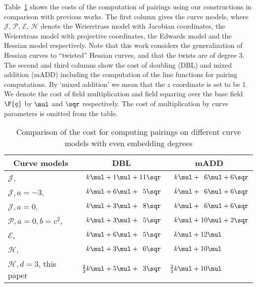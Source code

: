 Table~\ref{tbl-even} shows the costs of the computation of pairings using our constructions in comparison with previous works.
The first column gives the curve models, where 
$\mathcal{J}$, $\mathcal{P}$, $\mathcal{E}$, $\mathcal{H}$ denote the
Weierstrass model with Jacobian coordinates, the
Weierstrass model with projective coordinates,
the Edwards model and the
Hessian model respectively.
Note that this work considers the generalization of Hessian curves to ``twisted'' Hessian curves, and that the twists are of degree 3.
The second and third columns show the cost of doubling (DBL) and mixed addition (mADD) including the computation of the line functions for pairing computations.
By `mixed addition' we mean that the $z$ coordinate is set to be 1.
We denote the cost of field multiplication and field squaring over the base field $\F{q}$ by $\mul$ and $\sqr$ respectively.
The cost of multiplication by curve parameters is omitted from the table.

\begin{table}[h]
\centering
\caption{Comparison of the cost for computing pairings on different curve models with even embedding degrees}

\begin{tabular}{ l | l | l}
\hline
\multicolumn{1}{c|}{Curve models}	&\multicolumn{1}{c|}{DBL}	&\multicolumn{1}{c}{mADD}	\\
\hline
$\mathcal{J}$, \cite{2008/IonicaJoux08} \cite{2009/fastertate}
				&$\phantom{\frac{2}{3}}k\mul + 1\mul + 11\sqr$			&$\phantom{\frac{2}{3}}k\mul + \phantom{0}6\mul + 6\sqr$	\\
$\mathcal{J},a = -3$, \cite{2009/fastertate}
				&$\phantom{\frac{2}{3}}k\mul + 6\mul + \phantom{0}5\sqr$	&$\phantom{\frac{2}{3}}k\mul + \phantom{0}6\mul + 6\sqr$	\\
$\mathcal{J},a = 0$, \cite{2009/fastertate}		
				&$\phantom{\frac{2}{3}}k\mul + 3\mul + \phantom{0}8\sqr$	&$\phantom{\frac{2}{3}}k\mul + \phantom{0}6\mul + 6\sqr$	\\
$\mathcal{P},a = 0, b = c^2$, \cite{2009/craig}
				&$\phantom{\frac{2}{3}}k\mul + 3\mul + \phantom{0}5\sqr$	&$\phantom{\frac{2}{3}}k\mul + 10\mul + 2\sqr$	\\
$\mathcal{E}$, \cite{2009/fastertate}			
				&$\phantom{\frac{2}{3}}k\mul + 6\mul + \phantom{0}5\sqr$	&$\phantom{\frac{2}{3}}k\mul + 12\mul$	\\
$\mathcal{H}$, \cite{2010/Gu}	&$\phantom{\frac{2}{3}}k\mul + 3\mul + \phantom{0}6\sqr$	&$\phantom{\frac{2}{3}}k\mul + 10\mul$	\\
\hline
$\mathcal{H},d=3$, this paper
				&$\frac{2}{3}k\mul + 5\mul + \phantom{0}3\sqr$
												&$\frac{2}{3}k\mul + 10\mul$	\\
\hline
\end{tabular}
\label{tbl-even}


\end{table}

